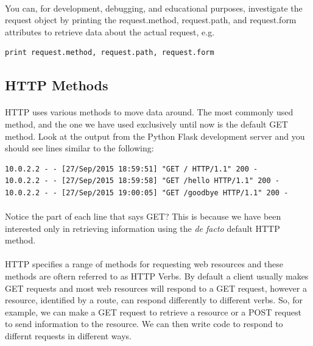 \documentclass[12pt, a4paper, twoside]{book}
\begin{document}
\paragraph{} You can, for development, debugging, and educational purposes, investigate the request object by printing the request.method, request.path, and request.form attributes to retrieve data about the actual request, e.g.

\begin{lstlisting}
print request.method, request.path, request.form
\end{lstlisting}

\subsection{HTTP Methods}
\label{http-methods}
\paragraph{} HTTP uses various methods to move data around. The most commonly used method, and the one we have used exclusively until now is the default GET method. Look at the output from the Python Flask development server and you should see lines similar to the following:

\begin{lstlisting}[style=DOS]
10.0.2.2 - - [27/Sep/2015 18:59:51] "GET / HTTP/1.1" 200 -
10.0.2.2 - - [27/Sep/2015 18:59:58] "GET /hello HTTP/1.1" 200 -
10.0.2.2 - - [27/Sep/2015 19:00:05] "GET /goodbye HTTP/1.1" 200 -
\end{lstlisting}

\paragraph{} Notice the part of each line that says GET? This is because we have been interested only in retrieving information using the \emph{de facto} default HTTP method.
\paragraph{} HTTP specifies a range of methods for requesting web resources and these methods are oftern referred to as HTTP Verbs. By default a client usually makes GET requests and most web resources will respond to a GET request, however a resource, identified by a route, can respond differently to different verbs. So, for example, we can make a GET request to retrieve a resource or a POST request to send information to the resource. We can then write code to respond to differnt requests in different ways.
\end{document}
